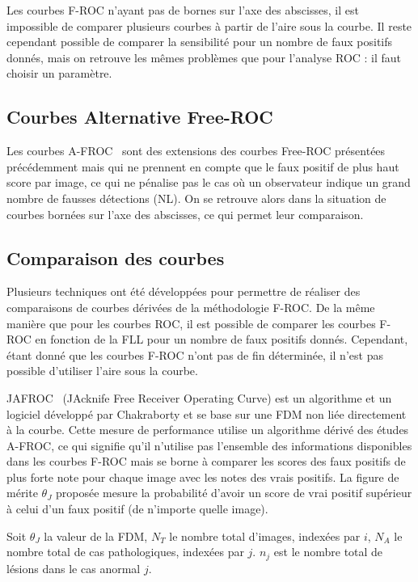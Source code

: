 Les courbes F-ROC n'ayant pas de bornes sur l’axe des abscisses, il est impossible de comparer plusieurs courbes à partir de l'aire sous la courbe. Il reste cependant possible de comparer la sensibilité pour un nombre de faux positifs donnés, mais on retrouve les mêmes problèmes que pour l'analyse ROC : il faut choisir un paramètre.

\subsection{Courbes Alternative Free-ROC}

Les courbes A-FROC~\cite{chakraborty1990free} sont des extensions des courbes Free-ROC présentées précédemment mais qui ne prennent en compte que le faux positif de plus haut score par image, ce qui ne pénalise pas le cas où un observateur indique un grand nombre de fausses détections (NL). On se retrouve alors dans la situation de courbes bornées sur l'axe des abscisses, ce qui permet leur comparaison.

\subsection{Comparaison des courbes}
\label{lab:AFROC}
Plusieurs techniques ont été développées pour permettre de réaliser des comparaisons de courbes dérivées de la méthodologie F-ROC. De la même manière que pour les courbes ROC, il est possible de comparer les courbes F-ROC en fonction de la FLL pour un nombre de faux positifs donnés. Cependant, étant donné que les courbes F-ROC n'ont pas de fin déterminée, il n'est pas possible d'utiliser l'aire sous la courbe. 

JAFROC~\cite{chakraborty2004observer} (JAcknife Free Receiver Operating Curve) est un algorithme et un logiciel développé par Chakraborty et se base sur une FDM non liée directement à la courbe. Cette mesure de performance utilise un algorithme dérivé des études A-FROC, ce qui signifie qu'il n'utilise pas l'ensemble des informations disponibles dans les courbes F-ROC mais se borne à comparer les scores des faux positifs de plus forte note pour chaque image avec les notes des vrais positifs. La figure de mérite $\theta_J$ proposée mesure la probabilité d'avoir un score de vrai positif supérieur à celui d'un faux positif (de n'importe quelle image).

Soit $\theta_J$ la valeur de la FDM, $N_T$ le nombre total d'images, indexées par $i$, $N_A$ le nombre total de cas pathologiques, indexées par $j$. $n_j$ est le nombre total de lésions dans le cas anormal $j$.

